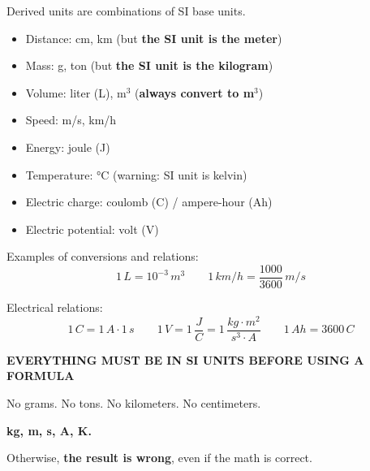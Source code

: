 \documentclass[11pt,a4paper]{article}
\newcommand{\theorybox}[2]{
\begin{tcolorbox}[title=\textbf{#1}]
#2
\end{tcolorbox}
}
\begin{document}
\theorybox{B - Common derived units}{
Derived units are combinations of SI base units.

\begin{itemize}
\item Distance: cm, km (but \textbf{the SI unit is the meter})
\item Mass: g, ton (but \textbf{the SI unit is the kilogram})
\item Volume: liter (L), m$^3$ (\textbf{always convert to m$^3$})
\item Speed: m/s, km/h
\item Energy: joule (J)
\item Temperature: °C (warning: SI unit is kelvin)
\item Electric charge: coulomb (C) / ampere-hour (Ah)
\item Electric potential: volt (V)
\end{itemize}

Examples of conversions and relations:
\[
1\,\si{L} = 10^{-3}\,\si{m^3}
\qquad
1\,\si{km/h} = \frac{1000}{3600}\,\si{m/s}
\]

Electrical relations:
\[
1\,\si{C} = 1\,\si{A} \cdot 1\,\si{s}
\qquad
1\,\si{V} = 1\,\frac{\si{J}}{\si{C}} = 1\,\frac{kg \cdot m^2}{s^3 \cdot A}
\qquad
1\,\si{Ah} = 3600\,\si{C}
\]
}

\theorybox{C - ABSOLUTE RULE - SI UNITS}{
\centering
\textbf{\Large EVERYTHING MUST BE IN SI UNITS BEFORE USING A FORMULA}

\vspace{0.2cm}

No grams.  
No tons.  
No kilometers.  
No centimeters.  

\textbf{kg, m, s, A, K.}

Otherwise, \textbf{the result is wrong}, even if the math is correct.
}
\end{document}
